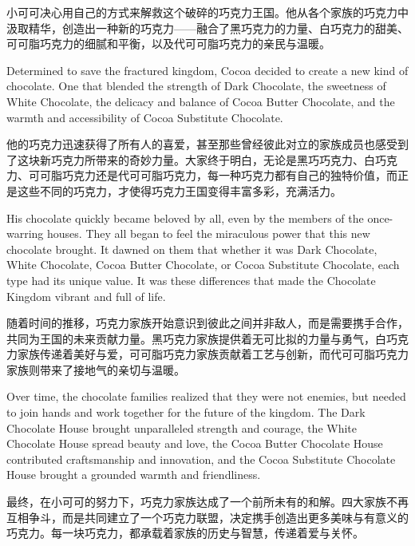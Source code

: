 小可可决心用自己的方式来解救这个破碎的巧克力王国。他从各个家族的巧克力中汲取精华，创造出一种新的巧克力——融合了黑巧克力的力量、白巧克力的甜美、可可脂巧克力的细腻和平衡，以及代可可脂巧克力的亲民与温暖。

\begin{flushright} Determined to save the fractured kingdom, Cocoa decided to create a new kind of chocolate. One that blended the strength of Dark Chocolate, the sweetness of White Chocolate, the delicacy and balance of Cocoa Butter Chocolate, and the warmth and accessibility of Cocoa Substitute Chocolate. \end{flushright}

他的巧克力迅速获得了所有人的喜爱，甚至那些曾经彼此对立的家族成员也感受到了这块新巧克力所带来的奇妙力量。大家终于明白，无论是黑巧巧克力、白巧克力、可可脂巧克力还是代可可脂巧克力，每一种巧克力都有自己的独特价值，而正是这些不同的巧克力，才使得巧克力王国变得丰富多彩，充满活力。

\begin{flushright} His chocolate quickly became beloved by all, even by the members of the once-warring houses. They all began to feel the miraculous power that this new chocolate brought. It dawned on them that whether it was Dark Chocolate, White Chocolate, Cocoa Butter Chocolate, or Cocoa Substitute Chocolate, each type had its unique value. It was these differences that made the Chocolate Kingdom vibrant and full of life. \end{flushright}

随着时间的推移，巧克力家族开始意识到彼此之间并非敌人，而是需要携手合作，共同为王国的未来贡献力量。黑巧克力家族提供着无可比拟的力量与勇气，白巧克力家族传递着美好与爱，可可脂巧克力家族贡献着工艺与创新，而代可可脂巧克力家族则带来了接地气的亲切与温暖。

\begin{flushright} Over time, the chocolate families realized that they were not enemies, but needed to join hands and work together for the future of the kingdom. The Dark Chocolate House brought unparalleled strength and courage, the White Chocolate House spread beauty and love, the Cocoa Butter Chocolate House contributed craftsmanship and innovation, and the Cocoa Substitute Chocolate House brought a grounded warmth and friendliness. \end{flushright}

最终，在小可可的努力下，巧克力家族达成了一个前所未有的和解。四大家族不再互相争斗，而是共同建立了一个巧克力联盟，决定携手创造出更多美味与有意义的巧克力。每一块巧克力，都承载着家族的历史与智慧，传递着爱与关怀。

